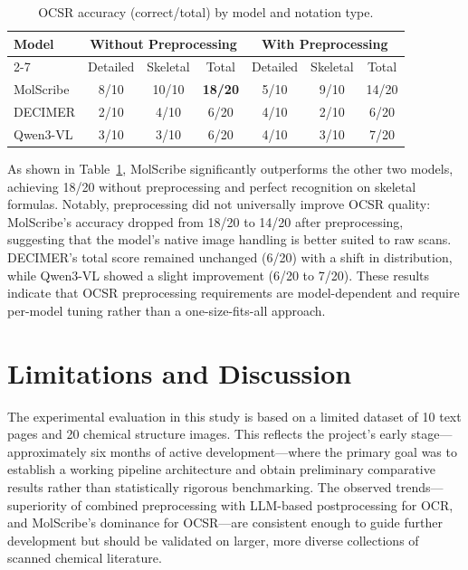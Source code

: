 \documentclass[conference]{IEEEtran}
\begin{document}
\begin{table}[t]
\centering
\small
\caption{OCSR accuracy (correct/total) by model and notation type.}
\label{tab:ocsr}
\begin{tabular}{lcccccc}
\toprule
\multirow{2}{*}{Model} & \multicolumn{3}{c}{Without Preprocessing} & \multicolumn{3}{c}{With Preprocessing} \\
\cline{2-7}
 & Detailed & Skeletal & Total & Detailed & Skeletal & Total \\
\midrule
MolScribe & 8/10 & 10/10 & \textbf{18/20} & 5/10 & 9/10 & 14/20 \\
DECIMER & 2/10 & 4/10 & 6/20 & 4/10 & 2/10 & 6/20 \\
Qwen3-VL & 3/10 & 3/10 & 6/20 & 4/10 & 3/10 & 7/20 \\
\bottomrule
\end{tabular}
\end{table}

As shown in Table~\ref{tab:ocsr}, MolScribe significantly outperforms the other two models, achieving 18/20 without preprocessing and perfect recognition on skeletal formulas. Notably, preprocessing did not universally improve OCSR quality: MolScribe's accuracy dropped from 18/20 to 14/20 after preprocessing, suggesting that the model's native image handling is better suited to raw scans. DECIMER's total score remained unchanged (6/20) with a shift in distribution, while Qwen3-VL showed a slight improvement (6/20 to 7/20). These results indicate that OCSR preprocessing requirements are model-dependent and require per-model tuning rather than a one-size-fits-all approach.

\section{Limitations and Discussion}

The experimental evaluation in this study is based on a limited dataset of 10 text pages and 20 chemical structure images. This reflects the project's early stage---approximately six months of active development---where the primary goal was to establish a working pipeline architecture and obtain preliminary comparative results rather than statistically rigorous benchmarking. The observed trends---superiority of combined preprocessing with LLM-based postprocessing for OCR, and MolScribe's dominance for OCSR---are consistent enough to guide further development but should be validated on larger, more diverse collections of scanned chemical literature.
\end{document}
